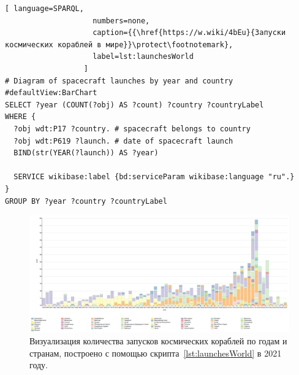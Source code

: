 \begin{lstlisting}[ language=SPARQL, 
                    numbers=none, 
                    caption={{\href{https://w.wiki/4bEu}{Запуски космических кораблей в мире}}\protect\footnotemark}, 
                    label=lst:launchesWorld
                  ]
# Diagram of spacecraft launches by year and country
#defaultView:BarChart
SELECT ?year (COUNT(?obj) AS ?count) ?country ?countryLabel
WHERE {
  ?obj wdt:P17 ?country. # spacecraft belongs to country 
  ?obj wdt:P619 ?launch. # date of spacecraft launch
  BIND(str(YEAR(?launch)) AS ?year)
  
  SERVICE wikibase:label {bd:serviceParam wikibase:language "ru".}
}
GROUP BY ?year ?country ?countryLabel
\end{lstlisting}
\label{question:spacecraft_2}

\begin{figure}[h!]
  \includegraphics[width=\linewidth]{graphics/chapter/spacecraft_space_station/Visualization of the number of spacecraft launches by year and country 2021.png}
  \caption[График запусков космичесих кораблей во всём мире по годам и странам]{Визуализация количества запусков космических кораблей по годам и странам, построено с помощью скрипта~\protect\ref{lst:launchesWorld} в 2021 году.}
  \label{fig:launchesWorld}%
\end{figure}

